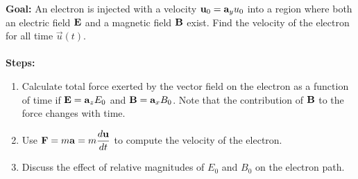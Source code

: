 \documentclass[../../header.tex]{subfiles}
\begin{document}
\textbf{Goal:} An electron is injected with a velocity $\mathbf{u}_0 = \mathbf{a}_y u_0$ into a region where both an electric field $\mathbf{E}$ and a magnetic field $\mathbf{B}$ exist. Find the velocity of the electron for all time $\vec{u}(t)$.\\
\\
\textbf{Steps:} 
\begin{enumerate}
\item Calculate total force exerted by the vector field on the electron as a function of time if $\mathbf{E} = \mathbf{a}_z E_0$ and $\mathbf{B} = \mathbf{a}_x B_0$. Note that the contribution of $\mathbf{B}$ to the force changes with time.


\item Use $\mathbf{F} = m\mathbf{a} = m\dfrac{d\mathbf{u}}{dt}$ to compute the velocity of the electron. 


\item Discuss the effect of relative magnitudes of $E_0$ and $B_0$ on the electron path.


\end{enumerate}
\end{document}

